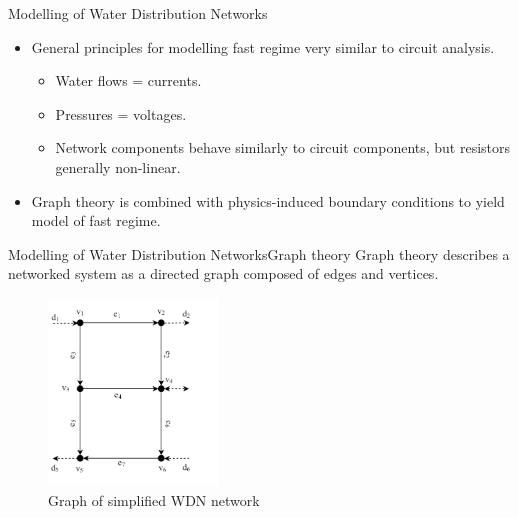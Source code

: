 
\begin{frame}{Modelling of Water Distribution Networks}
	\begin{itemize}
		\item General principles for modelling fast regime very similar to circuit analysis.
		\begin{itemize}
			\item Water flows = currents.
			\item Pressures = voltages.
			\item Network components behave similarly to circuit components, but resistors generally non-linear.
		\end{itemize}
		\item Graph theory is combined with physics-induced boundary conditions to yield model of fast regime.
	\end{itemize}
\end{frame}



\begin{frame}{Modelling of Water Distribution Networks}{Graph theory}
	Graph theory describes a networked system as a directed graph composed of edges and vertices.
	
	\begin{figure}[h!]
		\centering
		\includegraphics[width=0.4\textwidth]{Graphics/Graph.png}
		\caption{Graph of simplified WDN network }
		\label{fig:graph}
	\end{figure}
	

\end{frame}


